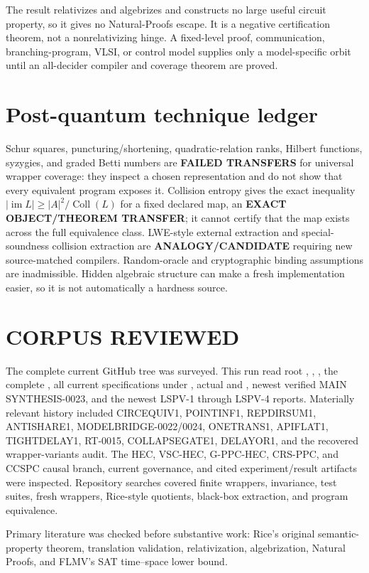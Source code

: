 \documentclass[11pt]{article}
\begin{document}
The result relativizes and algebrizes and constructs no large useful circuit
property, so it gives no Natural-Proofs escape.  It is a negative
certification theorem, not a nonrelativizing hinge.  A fixed-level proof,
communication, branching-program, VLSI, or control model supplies only a
model-specific orbit until an all-decider compiler and coverage theorem are
proved.

\section{Post-quantum technique ledger}
Schur squares, puncturing/shortening, quadratic-relation ranks, Hilbert
functions, syzygies, and graded Betti numbers are \textbf{FAILED TRANSFERS}
for universal wrapper coverage: they inspect a chosen representation and do
not show that every equivalent program exposes it.  Collision entropy gives
the exact inequality
$|\operatorname{im}L|\ge |A|^2/\operatorname{Coll}(L)$ for a fixed declared
map, an \textbf{EXACT OBJECT/THEOREM TRANSFER}; it cannot certify that the map
exists across the full equivalence class.  LWE-style external extraction and
special-soundness collision extraction are \textbf{ANALOGY/CANDIDATE}
requiring new source-matched compilers.  Random-oracle and cryptographic
binding assumptions are inadmissible.  Hidden algebraic structure can make a
fresh implementation easier, so it is not automatically a hardness source.

\section{CORPUS REVIEWED}
The complete current GitHub tree was surveyed.  This run read root
, , , the complete
, all current specifications under
, actual  and , newest verified
MAIN SYNTHESIS-0023, and the newest LSPV-1 through LSPV-4 reports.  Materially
relevant history included CIRCEQUIV1, POINTINF1, REPDIRSUM1, ANTISHARE1,
MODELBRIDGE-0022/0024, ONETRANS1, APIFLAT1, TIGHTDELAY1, RT-0015,
COLLAPSEGATE1, DELAYOR1, and the recovered wrapper-variants audit.  The HEC,
VSC-HEC, G-PPC-HEC, CRS-PPC, and CCSPC causal branch, current governance,
and cited experiment/result artifacts were inspected.  Repository searches
covered finite wrappers, invariance, test suites, fresh wrappers, Rice-style
quotients, black-box extraction, and program equivalence.

Primary literature was checked before substantive work: Rice's original
semantic-property theorem, translation validation, relativization,
algebrization, Natural Proofs, and FLMV's SAT time--space lower bound.
\end{document}
